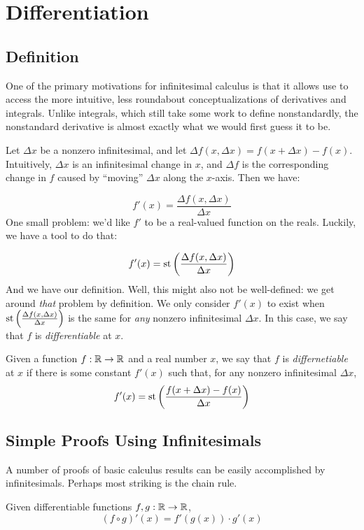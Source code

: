 \section{Differentiation}
\subsection{Definition}
One of the primary motivations for infinitesimal calculus is that it allows use to access the more intuitive, less roundabout conceptualizations of derivatives and integrals. Unlike integrals, which still take some work to define nonstandardly, the nonstandard derivative is almost exactly what we would first guess it to be.

Let $\Delta x$ be a nonzero infinitesimal, and let $\Delta f (x, \Delta x) = f(x + \Delta x) - f(x)$. Intuitively, $\Delta x$ is an infinitesimal change in $x$, and $\Delta f$ is the corresponding change in $f$ caused by ``moving'' $\Delta x$ along the $x$-axis. Then we have:

\[ f'(x) = \frac{\Delta f(x, \Delta x)}{\Delta x} \]
One small problem: we'd like $f'$ to be a real-valued function on the reals. Luckily, we have a tool to do that:

\[ f'(x) = \operatorname{st}\left(\frac{\Delta f(x, \Delta x)}{\Delta x}\right) \]
And we have our definition. Well, this might also not be well-defined: we get around \textit{that} problem by definition. We only consider $f'(x)$ to exist when $\operatorname{st}\left(\frac{\Delta f(x, \Delta x)}{\Delta x}\right)$ is the same for \textit{any} nonzero infinitesimal $\Delta x$. In this case, we say that $f$ is \textit{differentiable} at $x$.

\begin{defn}
    Given a function $f: \mathbb{R} \to \mathbb{R}$ and a real number $x$, we say that $f$ is \textit{differnetiable} at $x$ if there is some constant $f'(x)$ such that, for any nonzero infinitesimal $\Delta x$,
    \[f'(x) = \operatorname{st}\left(\frac{f(x + \Delta x) - f(x)}{\Delta x}\right)\]
\end{defn}

\subsection{Simple Proofs Using Infinitesimals}
A number of proofs of basic calculus results can be easily accomplished by infinitesimals. Perhaps most striking is the chain rule.

\begin{thm}\label{ChainRule}
    Given differentiable functions $f, g: \mathbb{R} \to \mathbb{R}$, 
    \[(f \circ g)'(x) = f'(g(x)) \cdot g'(x)\]
\end{thm}

